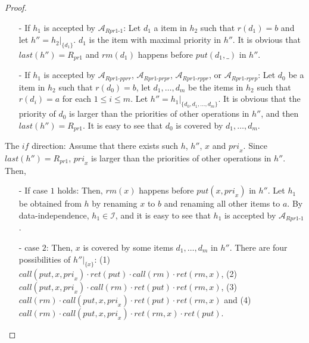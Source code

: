 \begin {proof}
\begin{itemize}
\setlength{\itemsep}{0.5pt}
\item[-] If $h_1$ is accepted by $\mathcal{A}_{\textit{Rpr1-1}}$: Let $d_1$ a item in $h_2$ such that $r(d_1)=b$ and let $h'' = h_2 \vert_{ \{ d_1 \} }$. $d_1$ is the item with maximal priority in $h''$. It is obvious that $\textit{last}(h'') = R_{\textit{pr1}}$ and $\textit{rm}(d_1)$ happens before $\textit{put}(d_1,\_)$ in $h''$.

\item[-] If $h_1$ is accepted by $\mathcal{A}_{\textit{Rpr1-pprr}}$, $\mathcal{A}_{\textit{Rpr1-prpr}}$, $\mathcal{A}_{\textit{Rpr1-rppr}}$, or $\mathcal{A}_{\textit{Rpr1-rprp}}$: Let $d_0$ be a item in $h_2$ such that $r(d_0)=b$, let $d_1,\ldots,d_m$ be the items in $h_2$ such that $r(d_i)=a$ for each $1 \leq i \leq m$. Let $h'' = h_1 \vert_{ \{ d_0, d_1, \ldots, d_m \} }$. It is obvious that the priority of $d_0$ is larger than the priorities of other operations in $h''$, and then $\textit{last}(h'') = R_{\textit{pr1}}$. It is easy to see that $d_0$ is covered by $d_1,\ldots,d_m$.
\end{itemize}

\noindent The $\textit{if}$ direction: Assume that there exists such $h$, $h''$, $x$ and $\textit{pri}_x$. Since $\textit{last}(h'') = R_{\textit{pr1}}$, $\textit{pri}_x$ is larger than the priorities of other operations in $h''$. Then,

\begin{itemize}
\setlength{\itemsep}{0.5pt}
\item[-] If case $1$ holds: Then, $\textit{rm}(x)$ happens before $\textit{put}(x,\textit{pri}_x)$ in $h''$. Let $h_1$ be obtained from $h$ by renaming $x$ to $b$ and renaming all other items to $a$. By data-independence, $h_1 \in \mathcal{I}$, and it is easy to see that $h_1$ is accepted by $\mathcal{A}_{\textit{Rpr1-1}}$.
\item[-] case $2$: Then, $x$ is covered by some items $d_1,\ldots,d_m$ in $h''$. There are four possibilities of $h'' \vert_{ \{ x \} }$: (1) $\textit{call}(\textit{put},x,\textit{pri}_x) \cdot \textit{ret}(\textit{put}) \cdot \textit{call}(\textit{rm}) \cdot \textit{ret}(\textit{rm},x)$, (2) $\textit{call}(\textit{put},x,\textit{pri}_x) \cdot \textit{call}(\textit{rm}) \cdot \textit{ret}(\textit{put}) \cdot \textit{ret}(\textit{rm},x)$, (3) $\textit{call}(\textit{rm}) \cdot \textit{call}(\textit{put},x,\textit{pri}_x) \cdot \textit{ret}(\textit{put}) \cdot \textit{ret}(\textit{rm},x)$ and (4) $\textit{call}(\textit{rm}) \cdot \textit{call}(\textit{put},x,\textit{pri}_x) \cdot \textit{ret}(\textit{rm},x) \cdot \textit{ret}(\textit{put})$.


\end{itemize}
\end{proof}
